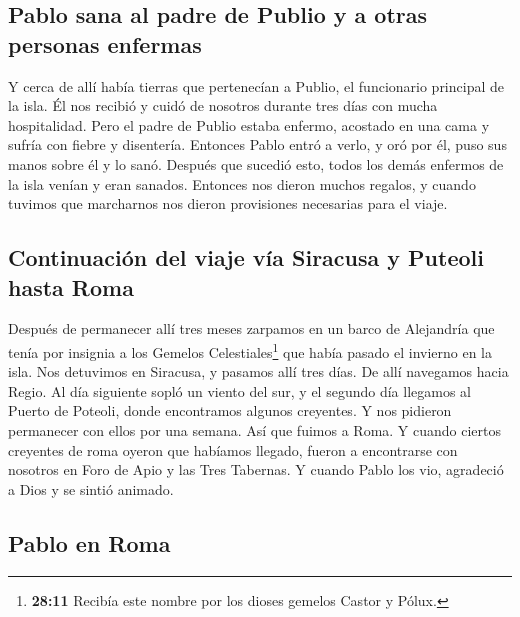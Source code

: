 \hypertarget{pablo-sana-al-padre-de-publio-y-a-otras-personas-enfermas}{%
\subsection{Pablo sana al padre de Publio y a otras personas
enfermas}\label{pablo-sana-al-padre-de-publio-y-a-otras-personas-enfermas}}

 Y cerca de allí había tierras que pertenecían a Publio,
el funcionario principal de la isla. Él nos recibió y cuidó de nosotros
durante tres días con mucha hospitalidad.  Pero el padre
de Publio estaba enfermo, acostado en una cama y sufría con fiebre y
disentería. Entonces Pablo entró a verlo, y oró por él, puso sus manos
sobre él y lo sanó.  Después que sucedió esto, todos los
demás enfermos de la isla venían y eran sanados. 
Entonces nos dieron muchos regalos, y cuando tuvimos que marcharnos nos
dieron provisiones necesarias para el viaje.

\hypertarget{continuaciuxf3n-del-viaje-vuxeda-siracusa-y-puteoli-hasta-roma}{%
\subsection{Continuación del viaje vía Siracusa y Puteoli hasta
Roma}\label{continuaciuxf3n-del-viaje-vuxeda-siracusa-y-puteoli-hasta-roma}}

 Después de permanecer allí tres meses zarpamos en un
barco de Alejandría que tenía por insignia a los Gemelos
Celestiales\footnote{\textbf{28:11} Recibía este nombre por los dioses
  gemelos Castor y Pólux.} que había pasado el invierno en la isla.
 Nos detuvimos en Siracusa, y pasamos allí tres días.
 De allí navegamos hacia Regio. Al día siguiente sopló un
viento del sur, y el segundo día llegamos al Puerto de Poteoli,
 donde encontramos algunos creyentes. Y nos pidieron
permanecer con ellos por una semana. Así que fuimos a Roma.
 Y cuando ciertos creyentes de roma oyeron que habíamos
llegado, fueron a encontrarse con nosotros en Foro de Apio y las Tres
Tabernas. Y cuando Pablo los vio, agradeció a Dios y se sintió animado.

\hypertarget{pablo-en-roma}{%
\subsection{Pablo en Roma}\label{pablo-en-roma}}

